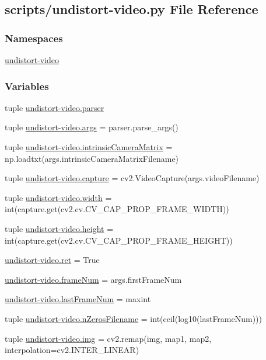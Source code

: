 \hypertarget{undistort-video_8py}{\subsection{scripts/undistort-\/video.py File Reference}
\label{undistort-video_8py}
}
\subsubsection*{Namespaces}
\begin{DoxyCompactItemize}
\item 
\hyperlink{namespaceundistort-video}{undistort-\/video}
\end{DoxyCompactItemize}
\subsubsection*{Variables}
\begin{DoxyCompactItemize}
\item 
tuple \hyperlink{namespaceundistort-video_a314addd602a3ab3a009e869d097d9fe0}{undistort-\/video.\-parser}
\item 
tuple \hyperlink{namespaceundistort-video_a20afbfc87021440bd19e2857ee5c0433}{undistort-\/video.\-args} = parser.\-parse\-\_\-args()
\item 
tuple \hyperlink{namespaceundistort-video_a951e4cadc09785e61bc64253f57ce464}{undistort-\/video.\-intrinsic\-Camera\-Matrix} = np.\-loadtxt(args.\-intrinsic\-Camera\-Matrix\-Filename)
\item 
tuple \hyperlink{namespaceundistort-video_a00bef9154ed9c32f455fd219314fe791}{undistort-\/video.\-capture} = cv2.\-Video\-Capture(args.\-video\-Filename)
\item 
tuple \hyperlink{namespaceundistort-video_adb4ad8deb16a759496b005486002c537}{undistort-\/video.\-width} = int(capture.\-get(cv2.\-cv.\-C\-V\-\_\-\-C\-A\-P\-\_\-\-P\-R\-O\-P\-\_\-\-F\-R\-A\-M\-E\-\_\-\-W\-I\-D\-T\-H))
\item 
tuple \hyperlink{namespaceundistort-video_a61478fbe5632ba582850efa0107e6852}{undistort-\/video.\-height} = int(capture.\-get(cv2.\-cv.\-C\-V\-\_\-\-C\-A\-P\-\_\-\-P\-R\-O\-P\-\_\-\-F\-R\-A\-M\-E\-\_\-\-H\-E\-I\-G\-H\-T))
\item 
\hyperlink{namespaceundistort-video_a5cf3044f0af40203e21a7231c2de5548}{undistort-\/video.\-ret} = True
\item 
\hyperlink{namespaceundistort-video_a80fb79bd13dda4c7d9cd257b402bef02}{undistort-\/video.\-frame\-Num} = args.\-first\-Frame\-Num
\item 
\hyperlink{namespaceundistort-video_a5637c9a1435b629b47668f6469dd7029}{undistort-\/video.\-last\-Frame\-Num} = maxint
\item 
tuple \hyperlink{namespaceundistort-video_abf76aea4e927f0a4a625e9f7032e0ff5}{undistort-\/video.\-n\-Zeros\-Filename} = int(ceil(log10(last\-Frame\-Num)))
\item 
tuple \hyperlink{namespaceundistort-video_a22a7a4e91d80b5f2cad6f8b9bd83c481}{undistort-\/video.\-img} = cv2.\-remap(img, map1, map2, interpolation=cv2.\-I\-N\-T\-E\-R\-\_\-\-L\-I\-N\-E\-A\-R)
\end{DoxyCompactItemize}
